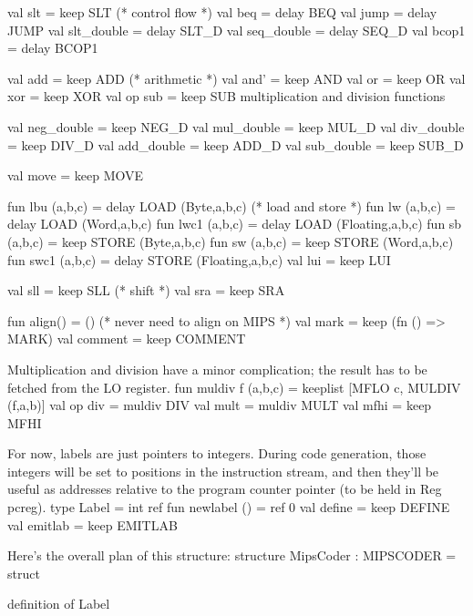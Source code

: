   val slt = keep SLT                    (* control flow *)
  val beq = delay BEQ
  val jump = delay JUMP
  val slt_double = delay SLT_D
  val seq_double = delay SEQ_D
  val bcop1 = delay BCOP1

  val add = keep ADD                    (* arithmetic *)
  val and' = keep AND
  val or = keep OR
  val xor = keep XOR
  val op sub = keep SUB
  \LA{}multiplication and division functions\RA{}

  val neg_double = keep NEG_D
  val mul_double = keep MUL_D
  val div_double = keep DIV_D
  val add_double = keep ADD_D
  val sub_double = keep SUB_D

  val move = keep MOVE

  fun lbu (a,b,c) = delay LOAD (Byte,a,b,c) (* load and store *)
  fun lw (a,b,c)  = delay LOAD (Word,a,b,c)
  fun lwc1 (a,b,c)  = delay LOAD (Floating,a,b,c)
  fun sb (a,b,c)  = keep STORE (Byte,a,b,c)
  fun sw (a,b,c)  = keep STORE (Word,a,b,c)
  fun swc1 (a,b,c)  = delay STORE (Floating,a,b,c)
  val lui = keep LUI

  val sll = keep SLL                    (* shift *)
  val sra = keep SRA

  fun align() = ()                      (* never need to align on MIPS *)
  val mark = keep (fn () => MARK)
  val comment = keep COMMENT
\endcode
{}

Multiplication and division have a minor complication; the
result has to be fetched from the LO register.
\enddocs
{}
\endmoddef
  fun muldiv f (a,b,c) = keeplist [MFLO c, MULDIV (f,a,b)]
  val op div = muldiv DIV
  val mult = muldiv MULT
  val mfhi = keep MFHI
\endcode
{}

For now, labels are just pointers to integers.
During code generation, those integers will be set to positions
in the instruction stream, and then they'll be useful as addresses
relative to the program counter pointer (to be held in \code{}Reg pcreg\edoc{}).
\enddocs
{}
\endmoddef
  type Label = int ref
\endcode
{}
\endmoddef
  fun newlabel () = ref 0
  val define = keep DEFINE
  val emitlab = keep EMITLAB
\endcode
{}

Here's the overall plan of this structure:
\enddocs
{}
\moddef{*}\endmoddef
structure MipsCoder : MIPSCODER = struct

  \LA{}definition of \code{}Label\edoc{}\RA{}

